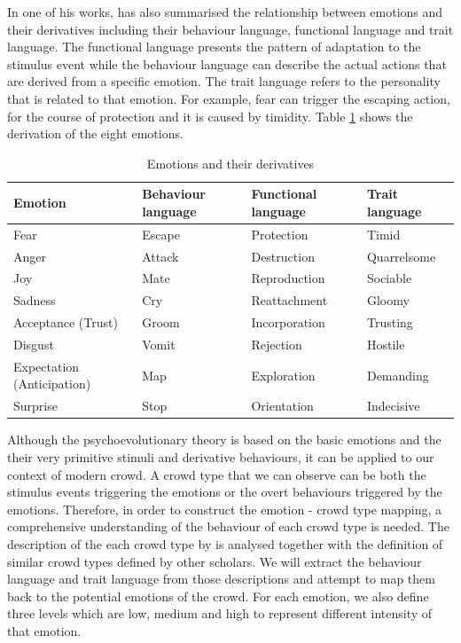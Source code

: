 In one of his works, \citet{plutchik2001integration} has also summarised the relationship between emotions and their derivatives including their behaviour language, functional language and trait language. The functional language presents the pattern of adaptation to the stimulus event while the behaviour language can describe the actual actions that are derived from a specific emotion. The trait language refers to the personality that is related to that emotion. For example, fear can trigger the escaping action, for the course of protection and it is caused by timidity. Table \ref{table:derivationOfEmotion} shows the derivation of the eight emotions.

\begin{table}
\caption{Emotions and their derivatives}
\label{table:derivationOfEmotion}
\begin{tabular}{|p{5cm}|p{3cm}|p{3cm}|p{3cm}|}
\hline
\textbf{Emotion} & \textbf{Behaviour language} & \textbf{Functional language} & \textbf{Trait language} \\
\hline
Fear & Escape & Protection & Timid \\
\hline
Anger & Attack & Destruction & Quarrelsome \\
\hline
Joy & Mate & Reproduction & Sociable \\
\hline
Sadness & Cry & Reattachment & Gloomy \\
\hline
Acceptance (Trust) & Groom & Incorporation & Trusting \\
\hline
Disgust & Vomit & Rejection & Hostile \\
\hline
Expectation (Anticipation) & Map & Exploration & Demanding \\
\hline
Surprise & Stop & Orientation & Indecisive \\
\hline
\end{tabular}
\end{table}

Although the psychoevolutionary theory is based on the basic emotions and the their very primitive stimuli and derivative behaviours, it can be applied to our context of modern crowd. A crowd type that we can observe can be both the stimulus events triggering the emotions or the overt behaviours triggered by the emotions. Therefore, in order to construct the emotion - crowd type mapping, a comprehensive understanding of the behaviour of each crowd type is needed. The description of the each crowd type by \citet{Berlonghi1995} is analysed together with the definition of similar crowd types defined by other scholars. We will extract the behaviour language and trait language from those descriptions and attempt to map them back to the potential emotions of the crowd. For each emotion, we also define three levels which are low, medium and high to represent different intensity of that emotion. 


